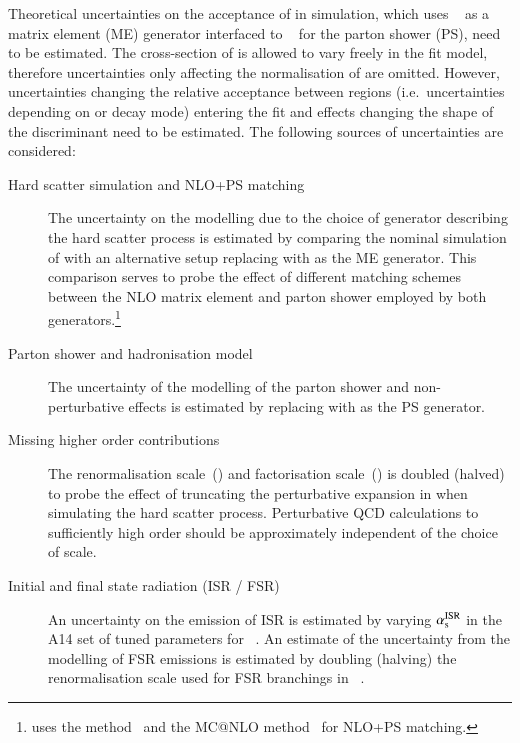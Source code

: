 Theoretical uncertainties on the acceptance of \ttbar in simulation, which uses
\POWHEGBOX[v2]~\cite{Frixione:2007nw} as a matrix element (ME) generator
interfaced to \PYTHIA[8.230]~\cite{Sjostrand:2014zea} for the parton shower
(PS), need to be estimated. The cross-section of \ttbar is allowed to vary
freely in the fit model, therefore uncertainties only affecting the
normalisation of \ttbar are omitted. However, uncertainties changing the
relative acceptance between regions (i.e.\ uncertainties depending on \tauhadvis
\pT or decay mode) entering the fit and effects changing the shape of the \mTW
discriminant need to be estimated. The following sources of uncertainties are
considered:
\begin{description}

\item[Hard scatter simulation and NLO+PS matching] The uncertainty on the
  modelling due to the choice of generator describing the hard scatter process
  is estimated by comparing the nominal simulation of \ttbar with an alternative
  setup replacing \POWHEGBOX[v2] with \MGNLO as the ME generator. This
  comparison serves to probe the effect of different matching schemes between
  the NLO matrix element and parton shower employed by both
  generators.\footnote{\POWHEGBOX[v2] uses the \POWHEG
    method~\cite{Nason:2004rx,Frixione:2007vw,Alioli:2010xd} and \MGNLO the
    MC@NLO method~\cite{Frixione:2002ik} for NLO+PS matching.}

\item[Parton shower and hadronisation model] The uncertainty of the modelling of
  the parton shower and non-perturbative effects is estimated by replacing
  \PYTHIA[8] with \HERWIG[7.0.4] as the PS generator.

\item[Missing higher order contributions] The renormalisation scale~(\muR) and
  factorisation scale~(\muF) is doubled (halved) to probe the effect of
  truncating the perturbative expansion in \alphas when simulating the hard
  scatter process. Perturbative QCD calculations to sufficiently high order
  should be approximately independent of the choice of scale.

\item[Initial and final state radiation (ISR / FSR)] An uncertainty on the
  emission of ISR is estimated by varying $\alpha_{\text{s}}^\text{ISR}$ in the A14 set of
  tuned parameters for \PYTHIA[8]~\cite{ATL-PHYS-PUB-2014-021}.
  An estimate of the uncertainty from the modelling of FSR emissions is
  estimated by doubling (halving) the renormalisation scale used for FSR
  branchings in
  \PYTHIA[8]~\cite{Sjostrand:2014zea,Mrenna:2016sih,pythia-variations-online}.


\end{description}
